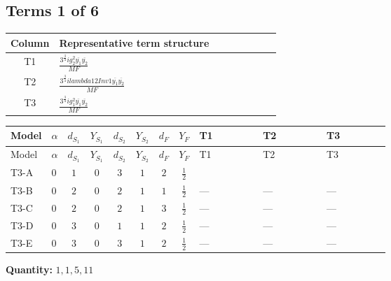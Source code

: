 \documentclass[8pt]{article}
\begin{document}
\begin{landscape}
\subsection*{Terms 1 of 6}
\begin{center}
\begin{tabular}{@{}c >{\raggedright\arraybackslash}p{0.82\linewidth}@{}}
\toprule
Column & Representative term structure \\
\midrule
T1 & \(\displaystyle \frac{3^{\frac{3}{4}} i g_{2}^{2} \overline{y_{1}} \overline{y_{2}}}{MF}\) \\
\midrule
T2 & \(\displaystyle \frac{3^{\frac{3}{4}} i lambda12Inv1 \overline{y_{1}} \overline{y_{2}}}{MF}\) \\
\midrule
T3 & \(\displaystyle \frac{3^{\frac{3}{4}} i g_{1}^{2} \overline{y_{1}} \overline{y_{2}}}{MF}\) \\
\midrule
\bottomrule
\end{tabular}
\end{center}
\smallskip
\tiny
\begin{longtable}{@{}llcccccc >{\raggedright\arraybackslash}p{0.21\linewidth} >{\raggedright\arraybackslash}p{0.21\linewidth} >{\raggedright\arraybackslash}p{0.21\linewidth}@{}}
\toprule
Model & $\alpha$ & $d_{S_1}$ & $Y_{S_1}$ & $d_{S_2}$ & $Y_{S_2}$ & $d_F$ & $Y_F$ & T1 & T2 & T3 \\
\midrule
\endfirsthead
\toprule
Model & $\alpha$ & $d_{S_1}$ & $Y_{S_1}$ & $d_{S_2}$ & $Y_{S_2}$ & $d_F$ & $Y_F$ & T1 & T2 & T3 \\
\midrule
\endhead
T3-A & $0$ & $1$ & $0$ & $3$ & $1$ & $2$ & $\frac{1}{2}$ & \scriptsize\adjustbox{max width=\linewidth}{$\begin{gathered} - \frac{17 \cdot 3^{\frac{3}{4}} i g_{2}^{2} \overline{y_{1}} \overline{y_{2}}}{24 MF}\end{gathered}$} & \scriptsize\adjustbox{max width=\linewidth}{$\begin{gathered} - \frac{3^{\frac{3}{4}} i lambda12Inv1 \overline{y_{1}} \overline{y_{2}}}{6 MF}\end{gathered}$} & \scriptsize\adjustbox{max width=\linewidth}{$\begin{gathered} - \frac{3^{\frac{3}{4}} i g_{1}^{2} \overline{y_{1}} \overline{y_{2}}}{8 MF}\end{gathered}$} \\
\midrule
T3-B & $0$ & $2$ & $0$ & $2$ & $1$ & $1$ & $\frac{1}{2}$ & --- & --- & --- \\
\midrule
T3-C & $0$ & $2$ & $0$ & $2$ & $1$ & $3$ & $\frac{1}{2}$ & --- & --- & --- \\
\midrule
T3-D & $0$ & $3$ & $0$ & $1$ & $1$ & $2$ & $\frac{1}{2}$ & --- & --- & --- \\
\midrule
T3-E & $0$ & $3$ & $0$ & $3$ & $1$ & $2$ & $\frac{1}{2}$ & --- & --- & --- \\
\midrule
\bottomrule
\end{longtable}
\clearpage
\noindent\textbf{Quantity: }$\mathrm{1,1,5,11}$\par\smallskip

\end{landscape}
\end{document}
